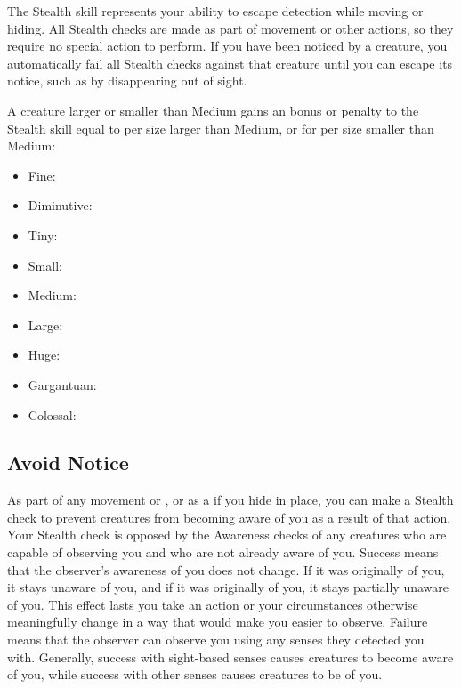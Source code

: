 \newpage
{}
        The Stealth skill represents your ability to escape detection while moving or hiding. All Stealth checks are made as part of movement or other actions, so they require no special action to perform. If you have been noticed by a creature, you automatically fail all Stealth checks against that creature until you can escape its notice, such as by disappearing out of sight.

        \label{Size and Stealth} A creature larger or smaller than Medium gains an bonus or penalty to the Stealth skill equal to  per size larger than Medium, or  for per size smaller than Medium:
            \begin{itemize}
                \item Fine: 
                \item Diminutive: 
                \item Tiny: 
                \item Small: 
                \item Medium: 
                \item Large: 
                \item Huge: 
                \item Gargantuan: 
                \item Colossal: 
            \end{itemize}

    \subsection{Avoid Notice}
        As part of any movement or , or as a  if you hide in place, you can make a Stealth check to prevent creatures from becoming aware of you as a result of that action.
        Your Stealth check is opposed by the Awareness checks of any creatures who are capable of observing you and who are not already aware of you.
        Success means that the observer's awareness of you does not change.
        If it was originally \unaware of you, it stays unaware of you, and if it was originally \partiallyunaware of you, it stays partially unaware of you.
        This effect lasts you take an action or your circumstances otherwise meaningfully change in a way that would make you easier to observe.
        Failure means that the observer can observe you using any senses they detected you with.
        Generally, success with sight-based senses causes creatures to become aware of you, while success with other senses causes creatures to be \partiallyunaware of you.

